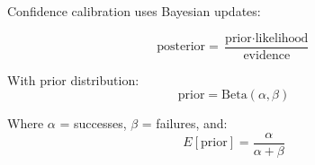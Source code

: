 Confidence calibration uses Bayesian updates:

\begin{equation}
\text{posterior} = \frac{\text{prior} \cdot \text{likelihood}}{\text{evidence}}
\end{equation}

With prior distribution:
\begin{equation}
\text{prior} = \text{Beta}(\alpha, \beta)
\end{equation}

Where $\alpha$ = successes, $\beta$ = failures, and:
\begin{equation}
E[\text{prior}] = \frac{\alpha}{\alpha + \beta}
\end{equation}

